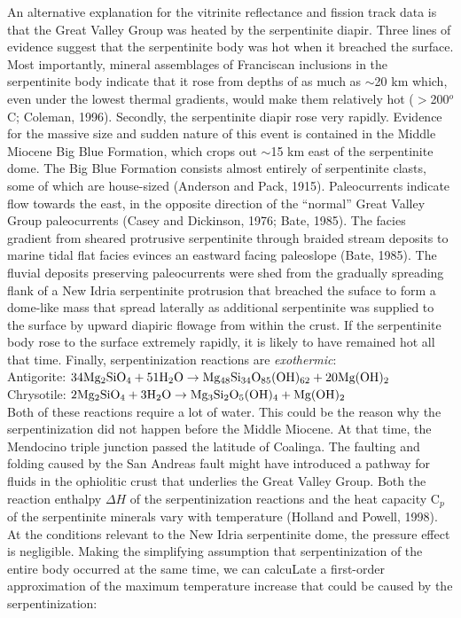 \documentclass[11pt,twoside]{article}
\begin{document}
An alternative  explanation for the vitrinite  reflectance and fission
track  data  is  that  the  Great  Valley  Group  was  heated  by  the
serpentinite  diapir.   Three  lines  of  evidence  suggest  that  the
serpentinite  body  was  hot  when  it  breached  the  surface.   Most
importantly,  mineral  assemblages  of  Franciscan inclusions  in  the
serpentinite  body indicate that  it rose  from depths  of as  much as
$\sim$20 km which, even under the lowest thermal gradients, would make
them  relatively  hot  ($>$200$^o$C;  Coleman, 1996).   Secondly,  the
serpentinite diapir  rose very rapidly. Evidence for  the massive size
and sudden nature of this event is contained in the Middle  Miocene Big
Blue Formation, which  crops out $\sim$15 km east  of the serpentinite
dome.  The Big Blue Formation consists almost entirely of serpentinite
clasts,  some of  which  are house-sized  (Anderson  and Pack,  1915).
Paleocurrents  indicate  flow  towards   the  east,  in  the  opposite
direction of  the ``normal''  Great Valley Group  paleocurrents (Casey
and Dickinson,  1976; Bate, 1985).   The facies gradient  from sheared
protrusive  serpentinite  through braided  stream  deposits to  marine
tidal flat facies evinces  an eastward facing paleoslope (Bate, 1985).
The  fluvial  deposits preserving  paleocurrents  were  shed from  the
gradually spreading flank of  a New Idria serpentinite protrusion that
breached the suface to form  a dome-like mass that spread laterally as
additional serpentinite was supplied to the surface by upward diapiric
flowage from within  the crust.  If the serpentinite  body rose to the
surface extremely rapidly, it is  likely to have remained hot all that
time.  Finally, serpentinization reactions are {\it exothermic}:\\

Antigorite:
$\rm 34 Mg_2SiO_4 + 51   H_2O \rightarrow Mg_{48}Si_{34}O_{85}(OH)_{62} + 20Mg(OH)_2$\\

Chrysotile:
$\rm 2 Mg_2SiO_4 + 3 H_2O \rightarrow Mg_3Si_2O_5(OH)_4 + Mg(OH)_2$\\

Both of  these reactions require  a lot of  water.  This could  be the
reason  why the  serpentinization  did not  happen  before the  Middle 
Miocene.   At that  time,  the Mendocino  triple  junction passed  the
latitude  of Coalinga.   The faulting  and folding  caused by  the San
Andreas  fault might  have  introduced  a pathway  for  fluids in  the
ophiolitic  crust that  underlies the  Great Valley  Group.   Both the
reaction enthalpy $\Delta H$ of the serpentinization reactions and the
heat capacity C$_p$ of the serpentinite minerals vary with temperature
(Holland  and Powell,  1998). At  the conditions  relevant to  the New
Idria serpentinite dome, the pressure effect is negligible. Making the
simplifying  assumption  that  serpentinization  of  the  entire  body
occurred   at  the  same   time,  we   can  calcuLate   a  first-order
approximation of the maximum temperature increase that could be caused
by the serpentinization:
\end{document}
